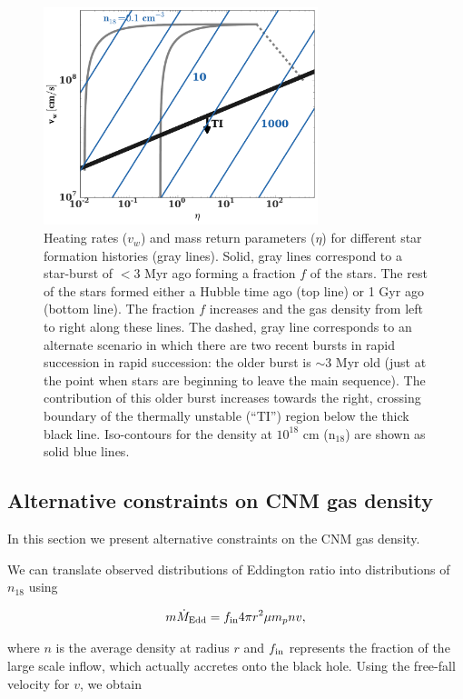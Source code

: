 \documentclass[usenatbib,fleqn]{mnras}
\begin{document}
\begin{figure} 
  \includegraphics[width=8cm]{cnm_plot.pdf}
  \caption{\label{fig:param} Heating rates ($v_w$) and mass return
    parameters ($\eta$) for different star formation histories (gray
    lines). Solid, gray lines correspond to a star-burst of $<3$ Myr
    ago forming a fraction $f$ of the stars. The rest of the stars
    formed either a Hubble time ago (top line) or 1 Gyr ago (bottom
    line). The fraction $f$ increases and the gas density from left to
    right along these lines. The dashed, gray line corresponds to an
    alternate scenario in which there are two recent bursts in rapid
    succession in rapid succession: the older burst is $\sim 3$ Myr
    old (just at the point when stars are beginning to leave the main
    sequence). The contribution of this older burst increases towards
    the right, crossing boundary of the thermally unstable (``TI'')
    region below the thick black line. Iso-contours for the density at
    $10^{18}$ cm ($\mathrm{n_{18}}$) are shown as solid blue lines.} 
\end{figure}


\subsection{Alternative constraints on CNM gas density}
In this section we present alternative constraints on the CNM gas
density.  

We can translate observed distributions of Eddington ratio into 
distributions of $n_{18}$ using

\begin{equation}
m \dot{M}_{\rm Edd}= f_{\rm in} 4 \pi r^2 \mu m_p n v,
\label{eq:mdot}
\end{equation}

where $n$ is the average density at radius $r$ and $f_{\rm in}$
represents the fraction of the large scale inflow, which actually
accretes onto the black hole.  Using the free-fall velocity for
$v$, we obtain
\end{document}
